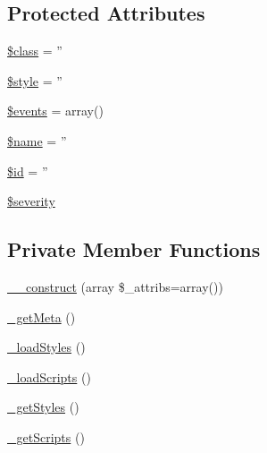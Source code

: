 \subsection*{Protected Attributes}
\begin{DoxyCompactItemize}
\item 
\hyperlink{classBaseElement_a99976a8e967db92e7800309f359b0803}{\$class} = ''
\item 
\hyperlink{classBaseElement_a429a3d642dd95f30e1059ef29564b87d}{\$style} = ''
\item 
\hyperlink{classBaseElement_a02cebe45d277b4ff8f29db08bad371ba}{\$events} = array()
\item 
\hyperlink{classBaseElement_a30b8cff187a9de659a70daf287d66f45}{\$name} = ''
\item 
\hyperlink{classBaseElement_a11b6989c43b53869a09f5ce65aa55b45}{\$id} = ''
\item 
\hyperlink{class__OWL_ad26b40a9dbbacb33e299b17826f8327c}{\$severity}
\end{DoxyCompactItemize}
\subsection*{Private Member Functions}
\begin{DoxyCompactItemize}
\item 
\hyperlink{classDocument_a826011efca3734aa7e11e467e5978af2}{\_\-\_\-construct} (array \$\_\-attribs=array())
\item 
\hyperlink{classDocument_a53f0ed9a11539f3b05c58177a1fd17de}{\_\-getMeta} ()
\item 
\hyperlink{classDocument_a028acb7648c597466fe1d0759eaa2dc5}{\_\-loadStyles} ()
\item 
\hyperlink{classDocument_ad85ed59a203fdab7be3683e24e7e797f}{\_\-loadScripts} ()
\item 
\hyperlink{classDocument_af7c9033e29bbaf426a3be9ecb58357f5}{\_\-getStyles} ()
\item 
\hyperlink{classDocument_a1c4fc6edfec7cba79755ee26f9618cc5}{\_\-getScripts} ()
\end{DoxyCompactItemize}
